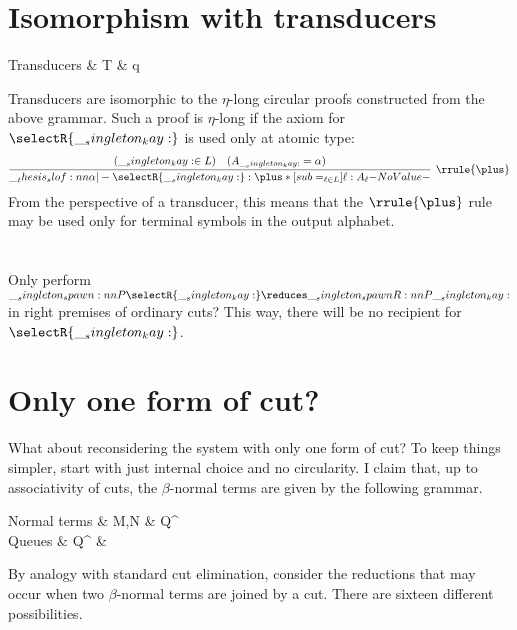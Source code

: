 

\section{Isomorphism with transducers}

\begin{syntax*}
  Transducers & T &
    q \mid {} \mid {} \mid \selectR{\kay}
\end{syntax*}
Transducers are isomorphic to the $\eta$-long circular proofs constructed from the above grammar.
Such a proof is $\eta$-long if the axiom for $\selectR{\kay}$ is used only at atomic type:
\begin{equation*}
  \infer[\rrule{\plus}]{\slof{\alpha |- \selectR{\kay} : \plus*[sub=_{\ell \in L}]{\ell:A_{\ell}}}}{
    \text{($\kay \in L$)} & \text{($A_{\kay} = \alpha$)}}
\end{equation*}
From the perspective of a transducer, this means that the $\rrule{\plus}$ rule may be used only for terminal symbols in the output alphabet.

\section{}

Only perform $\spawn{P}{\selectR{\kay}} \reduces \spawnR{P}{\kay}$ in right premises of ordinary cuts?
This way, there will be no recipient for $\selectR{\kay}$.


\section{Only one form of cut?}

What about reconsidering the system with only one form of cut?
To keep things simpler, start with just internal choice and no circularity.
I claim that, up to associativity of cuts, the $\beta$-normal terms are given by the following grammar.
\begin{syntax*}
  Normal terms & M,N &
    \fwd \mid Q^{\plus} \mid {}
  \\
  Q{ueues} & Q^{\plus} &
    \selectR{\kay} \mid {}
\end{syntax*}
By analogy with standard cut elimination, consider the reductions that may occur when two $\beta$-normal terms are joined by a cut.
There are sixteen different possibilities.


